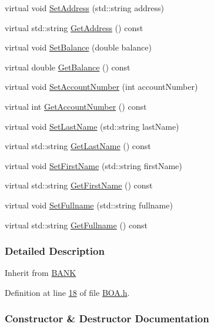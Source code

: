 \begin{DoxyCompactItemize}
virtual void \hyperlink{class_b_o_a_a2568c0027af6534bd08dde882e892caf}{Set\+Address} (std\+::string address)
\item 
virtual std\+::string \hyperlink{class_b_o_a_aa4aa2cf1ef0e876bb7911c00b5374493}{Get\+Address} () const 
\item 
virtual void \hyperlink{class_b_o_a_a0e06a7b7669b6a26a41b37d68f0a87b8}{Set\+Balance} (double balance)
\item 
virtual double \hyperlink{class_b_o_a_a07e30b7e5f5f20392b94af7344fd550c}{Get\+Balance} () const 
\item 
virtual void \hyperlink{class_b_o_a_a6b85963680344bd719ab862a50a09588}{Set\+Account\+Number} (int account\+Number)
\item 
virtual int \hyperlink{class_b_o_a_ad64bd63675f8902153aa6767994f05dc}{Get\+Account\+Number} () const 
\item 
virtual void \hyperlink{class_b_o_a_a7ea44308c05532cd11ff3ce8f14ea4c2}{Set\+Last\+Name} (std\+::string last\+Name)
\item 
virtual std\+::string \hyperlink{class_b_o_a_a081383edefc1f66b80c3fb8862ab070b}{Get\+Last\+Name} () const 
\item 
virtual void \hyperlink{class_b_o_a_a32fabc2b3acde832f3749696b302a0fe}{Set\+First\+Name} (std\+::string first\+Name)
\item 
virtual std\+::string \hyperlink{class_b_o_a_ae6bb3df4e1fb210610325ffd1985c7c0}{Get\+First\+Name} () const 
\item 
virtual void \hyperlink{class_b_o_a_a7ff134d56805088f46df8eb6f21a0a45}{Set\+Fullname} (std\+::string fullname)
\item 
virtual std\+::string \hyperlink{class_b_o_a_afafa24a20fda93382782cab66a3079ee}{Get\+Fullname} () const 
\end{DoxyCompactItemize}


\subsubsection{Detailed Description}
Inherit from \hyperlink{class_b_a_n_k}{B\+A\+NK} 

Definition at line \hyperlink{_b_o_a_8h_source_l00018}{18} of file \hyperlink{_b_o_a_8h_source}{B\+O\+A.\+h}.



\subsubsection{Constructor \& Destructor Documentation}
